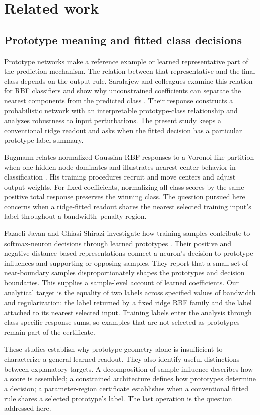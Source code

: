 \documentclass[preprint,12pt]{elsarticle}
\begin{document}
\section{Related work}
\subsection{Prototype meaning and fitted class decisions}
Prototype networks make a reference example or learned representative part of the prediction mechanism. The relation between that representative and the final class depends on the output rule. Saralajew and colleagues examine this relation for RBF classifiers and show why unconstrained coefficients can separate the nearest components from the predicted class \citep{saralajew2025}. Their response constructs a probabilistic network with an interpretable prototype-class relationship and analyzes robustness to input perturbations. The present study keeps a conventional ridge readout and asks when the fitted decision has a particular prototype-label summary.

Bugmann relates normalized Gaussian RBF responses to a Voronoi-like partition when one hidden node dominates and illustrates nearest-center behavior in classification \citep{bugmann1998}. His training procedures recruit and move centers and adjust output weights. For fixed coefficients, normalizing all class scores by the same positive total response preserves the winning class. The question pursued here concerns when a ridge-fitted readout shares the nearest selected training input's label throughout a bandwidth--penalty region.

Fazaeli-Javan and Ghiasi-Shirazi investigate how training samples contribute to softmax-neuron decisions through learned prototypes \citep{fazaeli2026}. Their positive and negative distance-based representations connect a neuron's decision to prototype influences and supporting or opposing samples. They report that a small set of near-boundary samples disproportionately shapes the prototypes and decision boundaries. This supplies a sample-level account of learned coefficients. Our analytical target is the equality of two labels across specified values of bandwidth and regularization: the label returned by a fixed ridge RBF family and the label attached to its nearest selected input. Training labels enter the analysis through class-specific response sums, so examples that are not selected as prototypes remain part of the certificate.

These studies establish why prototype geometry alone is insufficient to characterize a general learned readout. They also identify useful distinctions between explanatory targets. A decomposition of sample influence describes how a score is assembled; a constrained architecture defines how prototypes determine a decision; a parameter-region certificate establishes when a conventional fitted rule shares a selected prototype's label. The last operation is the question addressed here.
\end{document}

